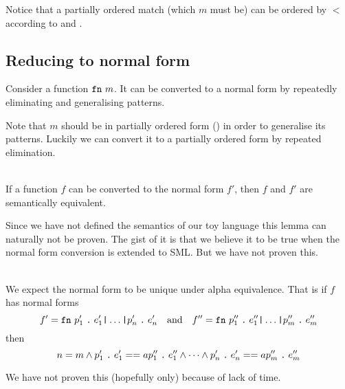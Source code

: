 Notice that a partially ordered match (which $m$ must be) can be ordered by $<$
according to  and
.

\subsection{Reducing to normal form}
Consider a function $\texttt{fn}\  m$. It can be converted to a normal form by repeatedly
eliminating and generalising patterns.

Note that $m$ should be in partially ordered form () in
order to generalise its patterns. Luckily we can convert it to a partially
ordered form by repeated elimination.

\begin{lemma}\ \\
  If a function $f$ can be converted to the normal form $f'$, then $f$ and $f'$
  are semantically equivalent.

  Since we have not defined the semantics of our toy language this lemma can
  naturally not be proven. The gist of it is that we believe it to be true when
  the normal form conversion is extended to SML. But we have not proven this.
\end{lemma}

\begin{lemma}\ \\
  We expect the normal form to be unique under alpha equivalence. That is if
  $f$  has normal forms
  \[
  f' = \texttt{fn}\  p'_1\mathrel{\texttt{.}}e'_1 \texttt{|} \ldots \texttt{|} p'_n\mathrel{\texttt{.}}e'_n
  \quad \textrm{and} \quad
  f'' = \texttt{fn}\  p''_1\mathrel{\texttt{.}}e''_1 \texttt{|} \ldots \texttt{|} p''_m\mathrel{\texttt{.}}e''_m
  \]
  then
  \[
  n = m \land p'_1\mathrel{\texttt{.}}e'_1 ==a p''_1\mathrel{\texttt{.}}e''_1 \land \cdots \land
  p'_n\mathrel{\texttt{.}}e'_n ==a p''_m\mathrel{\texttt{.}}e''_m
  \]

  We have not proven this (hopefully only) because of lack of time.
\end{lemma}

